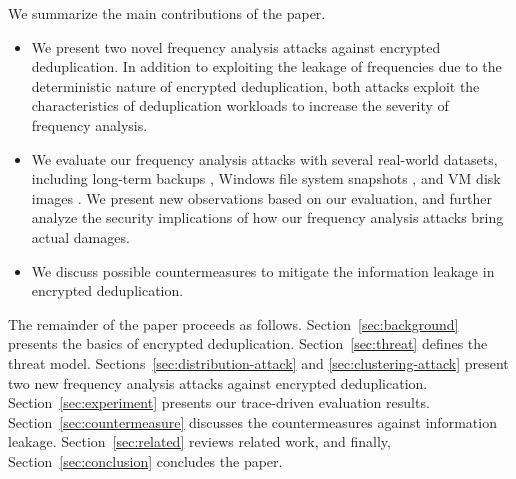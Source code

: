 \documentclass[bachelor]{thesis-uestc}
\begin{document}
We summarize the main contributions of the paper. 
%
\begin{itemize}[leftmargin=*]
\item
We present two novel frequency analysis attacks against encrypted
deduplication.  In addition to exploiting the leakage of frequencies due to
the deterministic nature of encrypted deduplication, both attacks exploit the
characteristics of deduplication workloads to increase the severity of
frequency analysis.
\item
We evaluate our frequency analysis attacks with several real-world datasets,
including long-term backups \cite{sun16,FSL14}, Windows file system snapshots
\cite{meyer11}, and VM disk images \cite{li15,qin17}.  We present new
observations based on our evaluation, and further analyze the security
implications of how our frequency analysis attacks bring actual damages. 
\item 
We discuss possible countermeasures to mitigate the information leakage in
encrypted deduplication.  
\end{itemize}

The remainder of the paper proceeds as follows. 
Section~\ref{sec:background} presents the basics of encrypted deduplication.
Section~\ref{sec:threat} defines the threat model. 
Sections~\ref{sec:distribution-attack} and \ref{sec:clustering-attack}
present two new frequency analysis attacks against encrypted deduplication.
Section~\ref{sec:experiment} presents our trace-driven evaluation results.
Section~\ref{sec:countermeasure} discusses the countermeasures against
information leakage. Section~\ref{sec:related} reviews related work, and
finally, Section~\ref{sec:conclusion} concludes the paper.





\end{document}
